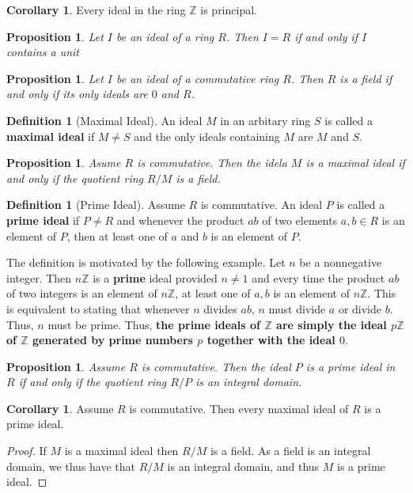 \documentclass[10pt, oneside, reqno]{amsart}
\theoremstyle{plain}%
\newtheorem{prop}[thm]{Proposition}
\theoremstyle{definition}
\newtheorem{defn}[thm]{Definition}
\newtheorem{cor}[thm]{Corollary}
\theoremstyle{remark}
\newcommand{\Z}{\mathbb{Z}}
\begin{document}
\begin{cor}
    Every ideal in the ring $\Z$ is principal.
\end{cor}

\begin{prop}
    Let $I$ be an ideal of a ring $R$.  Then $I = R$ if and only if $I$ contains a unit
\end{prop}

\begin{prop}
    Let $I$ be an ideal of a commutative ring $R$.  Then $R$ is a field if and only if its only ideals are $0$ and $R$.
\end{prop}

\begin{defn}[Maximal Ideal]
    An ideal $M$ in an arbitary ring $S$ is called a \textbf{maximal ideal} if $M \neq S$ and the only ideals containing $M$ are $M$ and $S$.
\end{defn}

\begin{prop}
    Asume $R$ is commutative.  Then the idela $M$ is a maximal ideal if and only if the quotient ring $R/M$ is a field.
\end{prop}


\begin{defn}[Prime Ideal]
    Assume $R$ is commutative.  An ideal $P$ is called a \textbf{prime ideal} if $P \neq R$ and whenever the product $ab$ of two elements $a,b \in R$ is an element of $P$, then at least one of $a$ and $b$ is an element of $P$.  
    
    The definition is motivated by the following example.  Let $n$ be a nonnegative integer.  Then $n\Z$ is a \textbf{prime} ideal provided $n \neq 1$ and every time the product $ab$ of two integers is an element of $n\Z$, at least one of $a,b$ is an element of $n\Z$. This is equivalent to stating that whenever $n$ divides $ab$, $n$ must divide $a$ or divide $b$.  Thus, $n$ must be prime.  Thus, \textbf{the prime ideals of $\Z$ are simply the ideal $p\Z$ of $\Z$ generated by prime numbers $p$ together with the ideal $0$}.
\end{defn}

\begin{prop}
    Assume $R$ is commutative.  Then the ideal $P$ is a prime ideal in $R$ if and only if the quotient ring $R/P$ is an integral domain.
\end{prop}

\begin{cor}
    Assume $R$ is commutative.  Then every maximal ideal of $R$ is a prime ideal.
\end{cor}
\begin{proof}
    If $M$ is a maximal ideal then $R/M$ is a field.  As a field is an integral domain, we thus have that $R/M$ is an integral domain, and thus $M$ is a prime ideal.
\end{proof}
\end{document}
